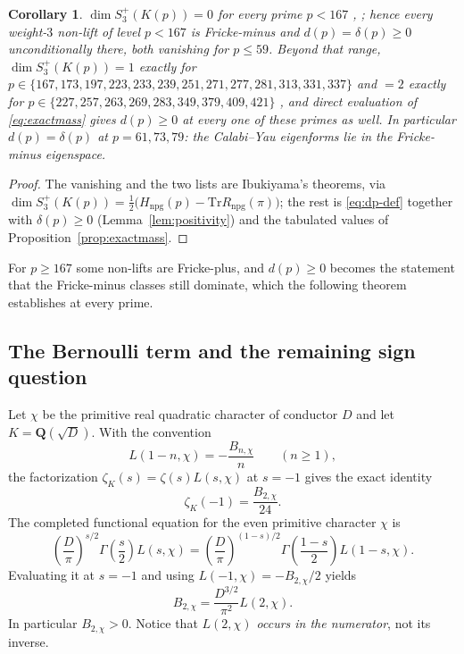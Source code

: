 \documentclass[10pt,a4paper]{amsart}
\newtheorem{corollary}[theorem]{Corollary}
\newcommand{\Tr}{\mathrm{Tr}}
\begin{document}
	\begin{corollary}\label{thm:uncond-regime}
		$\dim S_3^+(K(p))=0$ for every prime $p<167$
		\cite[Cor.~5.3]{Ibukiyama2019quinary},
		\cite[Prop.~8.2]{Ibukiyama-dim}; hence every weight-$3$ non-lift of level
		$p<167$ is Fricke-minus and $d(p)=\delta(p)\ge0$ unconditionally there,
		both vanishing for $p\le59$. Beyond that range, $\dim S_3^+(K(p))=1$
		exactly for $p\in\{167,173,197,223,233,239,251,271,277,281,313,331,337\}$
		and $=2$ exactly for
		$p\in\{227,257,263,269,283,349,379,409,421\}$
		\cite[Prop.~8.2]{Ibukiyama-dim}, and direct evaluation of
		\eqref{eq:exactmass} gives $d(p)\ge0$ at every one of these primes as
		well. In particular $d(p)=\delta(p)$ at $p=61,73,79$: the Calabi--Yau
		eigenforms lie in the Fricke-minus eigenspace.
	\end{corollary}
	
	\begin{proof}
		The vanishing and the two lists are Ibukiyama's theorems, via
		$\dim S_3^+(K(p))=\tfrac12\bigl(H_{\mathrm{npg}}(p)-\Tr
		R_{\mathrm{npg}}(\pi)\bigr)$; the rest is \eqref{eq:dp-def} together with
		$\delta(p)\ge0$ (Lemma~\ref{lem:positivity}) and the tabulated values of
		Proposition~\ref{prop:exactmass}.
	\end{proof}
	
	For $p\ge167$ some non-lifts are Fricke-plus, and $d(p)\ge0$ becomes the
	statement that the Fricke-minus classes still dominate, which the
	following theorem establishes at every prime.
	
	\subsection{The Bernoulli term and the remaining sign question}
	\label{ss:bernoulli-term}
	
	Let $\chi$ be the primitive real quadratic character of conductor $D$ and
	let $K=\mathbf Q(\sqrt D)$.  With the convention
	\[
	L(1-n,\chi)=-\frac{B_{n,\chi}}{n}\qquad(n\geq1),
	\]
	the factorization $\zeta_K(s)=\zeta(s)L(s,\chi)$ at $s=-1$ gives the
	exact identity
	\begin{equation}\label{eq:B2-zetaK}
		\zeta_K(-1)=\frac{B_{2,\chi}}{24}.
	\end{equation}
	The completed functional equation for the even primitive character $\chi$ is
	\[
	\left(\frac{D}{\pi}\right)^{s/2}\Gamma\!\left(\frac{s}{2}\right)L(s,\chi)
	=
	\left(\frac{D}{\pi}\right)^{(1-s)/2}
	\Gamma\!\left(\frac{1-s}{2}\right)L(1-s,\chi).
	\]
	Evaluating it at $s=-1$ and using
	$L(-1,\chi)=-B_{2,\chi}/2$ yields
	\begin{equation}\label{eq:B2-functional-equation}
		B_{2,\chi}=\frac{D^{3/2}}{\pi^2}L(2,\chi).
	\end{equation}
	In particular $B_{2,\chi}>0$.  Notice that \emph{$L(2,\chi)$ occurs in
		the numerator}, not its inverse.
	
\end{document}
